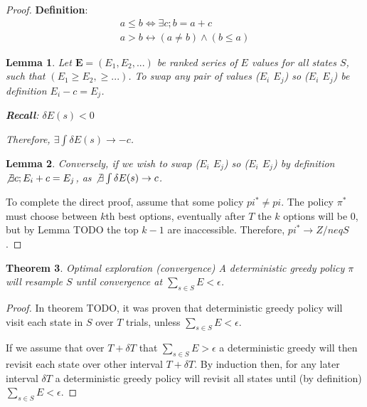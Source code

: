 \documentclass[9pt,twocolumn,twoside]{pnas-new}
\newtheorem{theorem}{Theorem}
\newtheorem{lemma}[theorem]{Lemma}
\begin{document}
{{ %
\begin{proof}
    \textbf{Definition}: 
    \begin{align}
        a \leq b \Leftrightarrow \exists c; b = a + c \\
        a > b \leftrightarrow (a \neq b) \wedge (b \leq a) 
    \end{align}

    \begin{lemma}
    Let $\textbf{E} = (E_1, E_2, ...)$ be ranked series of $E$ values for all states $S$, such that $(E_1 \geq E_2, \geq ...)$. To swap any pair of values ($E_i$ \geq $E_j$) so ($E_i$ \leq $E_j$) be definition $E_i - c = E_j$.  

    \textbf{Recall}: $\delta E(s) < 0$ 

    Therefore, $\exists \int \delta E(s) \rightarrow -c$. 
    \end{lemma}

    \begin{lemma}
    Conversely, if we wish to swap ($E_i$ \leq $E_j$) so ($E_i$ \geq $E_j$) by definition $\not \exists c; E_i + c = E_j$, as $\not \exists \int \delta E(s) \rightarrow c$. 
    \end{lemma}

    To complete the direct proof, assume that some policy $pi^* \neq pi$. The policy $\pi^*$ must choose between $k$th best options, eventually after $T$ the $k$ options will be 0, but by Lemma TODO the top $k-1$ are inaccessible. Therefore, $pi^* \rightarrow Z /neq S$.
\end{proof}

\begin{theorem}{Optimal exploration (convergence)}
    A deterministic greedy policy $\pi$ will resample $S$ until convergence at $\sum_{s \in S} E < \epsilon$.
\end{theorem}
\begin{proof}
    In theorem TODO, it was proven that deterministic greedy policy will visit each state in $S$ over $T$ trials, unless $\sum_{s \in S} E < \epsilon$. 
    
    If we assume that over $T + \delta T$ that $\sum_{s \in S} E > \epsilon$ a deterministic greedy will then revisit each state over other interval $T + \delta T$. By induction then, for any later interval $\delta T$ a deterministic greedy policy will revisit all states until (by definition) $\sum_{s \in S} E < \epsilon$.
\end{proof}

}}
\end{document}
